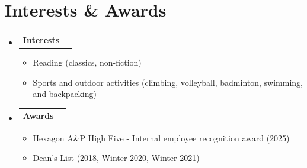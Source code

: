 \documentclass[letterpaper,11pt]{article}
\makeatletter
\newcommand{\resumeSubHeadingListStart}{
    \begin{itemize}[
        leftmargin=0.15in,
        label={},
        itemsep=2pt,
        topsep=0pt,
        parsep=0pt,
        partopsep=0pt
    ]
}
\newcommand{\resumeSubHeadingListEnd}{
    \end{itemize}
}
\newcommand{\resumeItemListStart}{
    \begin{itemize}[
        itemsep=0pt,
        topsep=1pt,
        parsep=0pt,
        partopsep=0pt
    ]
}
\newcommand{\resumeItemListEnd}{
    \end{itemize}
}
\newcommand{\resumeItem}[1]{
    \item \small{#1}
}
\newcommand{\resumeProjectHeading}[2]{
    \item
    \begin{tabular*}{0.97\textwidth}
        {l@{\extracolsep{\fill}}r}
        \small #1 & #2
    \end{tabular*}
}
\makeatother
\begin{document}
\section{Interests \& Awards}

\resumeSubHeadingListStart


    \resumeProjectHeading
        {\textbf{Interests}}
        {}

    \resumeItemListStart

        \resumeItem{
            Reading (classics, non-fiction)
        }

        \resumeItem{
            Sports and outdoor activities (climbing, volleyball,
            badminton, swimming, and backpacking)
        }

    \resumeItemListEnd



    \resumeProjectHeading
        {\textbf{Awards}}
        {}

    \resumeItemListStart

        \resumeItem{
            Hexagon A\&P High Five - Internal employee
            recognition award (2025)
        }

        \resumeItem{
            Dean's List (2018, Winter 2020, Winter 2021)
        }

    \resumeItemListEnd

\resumeSubHeadingListEnd
\end{document}
